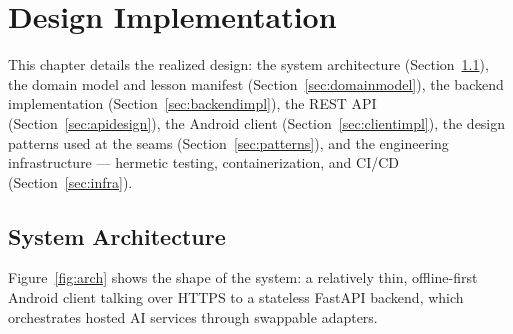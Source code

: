 \chapter{Design Implementation}
\label{ch:design}

This chapter details the realized design: the system architecture
(Section~\ref{sec:sysarch}), the domain model and lesson manifest
(Section~\ref{sec:domainmodel}), the backend implementation
(Section~\ref{sec:backendimpl}), the REST API (Section~\ref{sec:apidesign}),
the Android client (Section~\ref{sec:clientimpl}), the design patterns used
at the seams (Section~\ref{sec:patterns}), and the engineering
infrastructure --- hermetic testing, containerization, and CI/CD
(Section~\ref{sec:infra}).

\section{System Architecture}
\label{sec:sysarch}

Figure~\ref{fig:arch} shows the shape of the system: a relatively thin,
offline-first Android client talking over HTTPS to a stateless FastAPI
backend, which orchestrates hosted AI services through swappable adapters.

